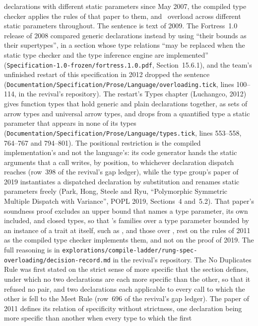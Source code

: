 \begin{description}
declarations with different static parameters since May 2007, the compiled type
checker applies the rules of that paper to them, and \library\ overload across
different static parameters throughout.
The sentence is text of 2009.
The Fortress~1.0 release of 2008 compared generic declarations instead by
using ``their bounds as their supertypes'', in a section whose type relations
``may be replaced when the static type checker and the type inference engine
are implemented'' (\nolinkurl{Specification-1.0-frozen/fortress.1.0.pdf},
Section~15.6.1), and the team's unfinished restart of this specification in
2012 dropped the sentence
(\nolinkurl{Documentation/Specification/Prose/Language/overloading.tick},
lines 100--114, in the revival's repository).
The restart's Types chapter (Luchangco, 2012) gives function types that hold
generic and plain declarations together, as sets of arrow types and universal
arrow types, and drops from a quantified type a static parameter that appears
in none of its types
(\nolinkurl{Documentation/Specification/Prose/Language/types.tick}, lines
553--558, 764--767 and 794--801).
The positional restriction is the compiled implementation's and not the
language's: its code generator hands the static arguments that a call writes,
by position, to whichever declaration dispatch reaches (row~398 of the
revival's gap ledger), while the type group's paper of 2019 instantiates a
dispatched declaration by substitution and renames static parameters freely
(Park, Hong, Steele and Ryu, ``Polymorphic Symmetric Multiple Dispatch with
Variance'', POPL 2019, Sections~4 and~5.2).
That paper's soundness proof excludes an upper bound that names a type
parameter, its own included, and closed types, so that \library's families over a type parameter
bounded by an instance of a trait at itself, such as , 
and those over , rest on the rules of 2011 as the compiled type
checker implements them, and not on the proof of 2019.
The full reasoning is in
\nolinkurl{explorations/compile-ladder/rung-spec-overloading/decision-record.md}
in the revival's repository.
The No Duplicates Rule was first stated on the strict sense of more specific
that the section defines, under which no two declarations are each more
specific than the other, so that it refused no pair, and two declarations each
applicable to every call to which the other is fell to the Meet Rule (row~696
of the revival's gap ledger).
The paper of 2011 defines its relation of specificity without strictness, one
declaration being more specific than another when every type to which the first

\end{description}

